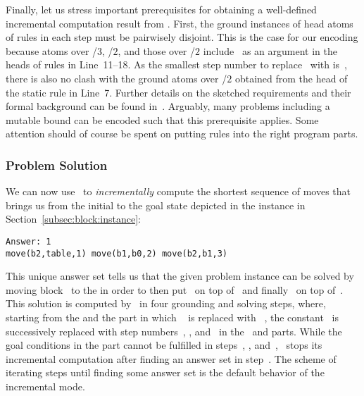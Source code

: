 Finally, let us stress important prerequisites for obtaining
a well-defined incremental computation result from \clingo.
First, the ground instances of head atoms of rules in each step must be pairwisely disjoint.
This is the case for our encoding because atoms over /$3$, /$2$,
and those over /$2$ include~ as an argument in the
heads of rules in Line~11--18. %
As the smallest step number to replace~ with is~,
there is also no clash with the ground atoms over /$2$
obtained from the head of the static rule in Line~7.
Further details on the sketched requirements and their formal background can
be found in~\cite{gekakaosscth08a}.
Arguably, many problems including a mutable bound can be encoded
such that this prerequisite applies.
Some attention should of course be spent on putting rules into the right program parts.

\subsubsection{Problem Solution}\label{subsec:block:solution}

We can now use \clingo\ to \emph{incrementally} compute the shortest
sequence of moves that brings us from the initial to the goal state
depicted in the instance in Section~\ref{subsec:block:instance}:%
%
\begin{lstlisting}[numbers=none]
Answer: 1
move(b2,table,1) move(b1,b0,2) move(b2,b1,3)
\end{lstlisting}
%
This unique answer set tells us
that the given problem instance can be solved by moving block~ to the 
in order to then put~ on top of~ and finally~ on top of~.
This solution is computed by \clingo\ in four grounding and solving steps,
where, starting from the  and the  part in which%
~ is replaced with%
~, 
the constant~ is successively replaced with step numbers~, , and~ in the~ and  parts.
While the goal %
conditions in the  part cannot be fulfilled in steps~, , and~,
\clingo\ stops its incremental computation after finding an answer set in step~.
The scheme of iterating steps until finding %
some answer set is the default behavior of the incremental mode.


